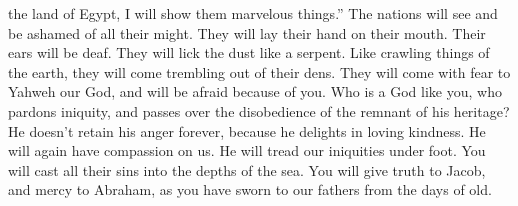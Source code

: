 the land of Egypt, I will show them marvelous things.'' 
The nations will see and be ashamed of all their might. They will lay
their hand on their mouth. Their ears will be deaf.  They
will lick the dust like a serpent. Like crawling things of the earth,
they will come trembling out of their dens. They will come with fear to
Yahweh our God, and will be afraid because of you.  Who
is a God like you, who pardons iniquity, and passes over the
disobedience of the remnant of his heritage? He doesn't retain his anger
forever, because he delights in loving kindness.  He will
again have compassion on us. He will tread our iniquities under foot.
You will cast all their sins into the depths of the sea. 
You will give truth to Jacob, and mercy to Abraham, as you have sworn to
our fathers from the days of old.
